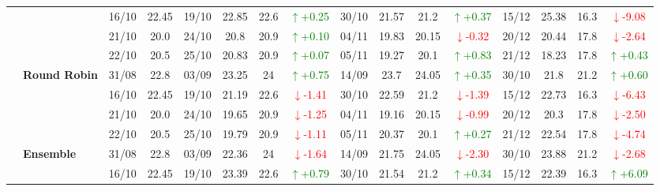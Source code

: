 \documentclass{ieeeaccess}
\begin{document}
{\begin{longtable}{llcc|cccc|cccc|cccc}
& 
& 16/10 & 22.45 & 19/10 & 22.85 & 22.6 & \textcolor{green}{\(\uparrow\)+0.25} & 30/10 & 21.57 & 21.2 & \textcolor{green}{\(\uparrow\)+0.37} & 15/12 & 25.38 & 16.3 & \textcolor{red}{\(\downarrow\)-9.08} \\

& 
& 21/10 & 20.0 & 24/10 & 20.8 & 20.9 & \textcolor{green}{\(\uparrow\)+0.10} & 04/11 & 19.83 & 20.15 & \textcolor{red}{\(\downarrow\)-0.32} & 20/12 & 20.44 & 17.8 & \textcolor{red}{\(\downarrow\)-2.64} \\

&
& 22/10 & 20.5 & 25/10 & 20.83 & 20.9 & \textcolor{green}{\(\uparrow\)+0.07} & 05/11 & 19.27 & 20.1 & \textcolor{green}{\(\uparrow\)+0.83} & 21/12 & 18.23 & 17.8 & \textcolor{green}{\(\uparrow\)+0.43} \\
\cmidrule(lr){2-16}


& \textbf{Round Robin}
& 31/08 & 22.8 & 03/09 & 23.25 & 24 & \textcolor{green}{\(\uparrow\)+0.75} & 14/09 & 23.7 & 24.05 & \textcolor{green}{\(\uparrow\)+0.35} & 30/10 & 21.8 & 21.2 & \textcolor{green}{\(\uparrow\)+0.60} \\

&
& 16/10 & 22.45 & 19/10 & 21.19 & 22.6 & \textcolor{red}{\(\downarrow\)-1.41} & 30/10 & 22.59 & 21.2 & \textcolor{red}{\(\downarrow\)-1.39} & 15/12 & 22.73 & 16.3 & \textcolor{red}{\(\downarrow\)-6.43} \\

&
& 21/10 & 20.0 & 24/10 & 19.65 & 20.9 & \textcolor{red}{\(\downarrow\)-1.25} & 04/11 & 19.16 & 20.15 & \textcolor{red}{\(\downarrow\)-0.99} & 20/12 & 20.3 & 17.8 & \textcolor{red}{\(\downarrow\)-2.50} \\

&
& 22/10 & 20.5 & 25/10 & 19.79 & 20.9 & \textcolor{red}{\(\downarrow\)-1.11} & 05/11 & 20.37 & 20.1 & \textcolor{green}{\(\uparrow\)+0.27} & 21/12 & 22.54 & 17.8 & \textcolor{red}{\(\downarrow\)-4.74} \\
\cmidrule(lr){2-16}


& \textbf{Ensemble}
& 31/08 & 22.8 & 03/09 & 22.36 & 24 & \textcolor{red}{\(\downarrow\)-1.64} & 14/09 & 21.75 & 24.05 & \textcolor{red}{\(\downarrow\)-2.30} & 30/10 & 23.88 & 21.2 & \textcolor{red}{\(\downarrow\)-2.68} \\

&
& 16/10 & 22.45 & 19/10 & 23.39 & 22.6 & \textcolor{green}{\(\uparrow\)+0.79} & 30/10 & 21.54 & 21.2 & \textcolor{green}{\(\uparrow\)+0.34} & 15/12 & 22.39 & 16.3 & \textcolor{green}{\(\uparrow\)+6.09} \\


\end{longtable}}
\end{document}
